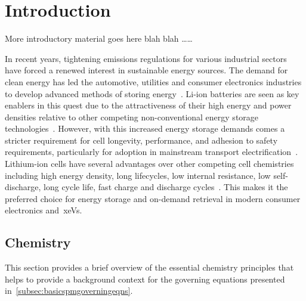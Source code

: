 
\clearpage
\chapter{Introduction}\label{ch:intro}

More introductory material goes here blah blah \dots \dots

In  recent  years,  tightening  emissions  regulations  for  various  industrial
sectors  have  forced   a  renewed  interest  in   sustainable  energy  sources.
The   demand  for   clean  energy   has  led   the  automotive,   utilities  and
consumer  electronics   industries  to  develop  advanced   methods  of  storing
energy~\cite{Weiss2011}.  Li-ion   batteries  are   seen  as  key   enablers  in
this  quest  due   to  the  attractiveness  of  their  high   energy  and  power
densities   relative  to   other  competing   non-conventional  energy   storage
technologies~\cite{Ibrahim2008}.  However, with  this  increased energy  storage
demands  comes  a stricter  requirement  for  cell longevity,  performance,  and
adhesion  to  safety  requirements,  particularly  for  adoption  in  mainstream
transport  electrification~\cite{Andrea2010}.  Lithium-ion  cells  have  several
advantages over other competing cell  chemistries including high energy density,
long lifecycles, low  internal resistance, low self-discharge,  long cycle life,
fast charge  and discharge cycles~\cite{Reddy2011,Plett2015}. This  makes it the
preferred choice for  energy storage and on-demand retrieval  in modern consumer
electronics and~\glspl{xeV}.


\section{Chemistry}\label{subsec:liionchemistry}

This section  provides a  brief overview of  the essential  chemistry principles
that helps to provide a background context for the governing equations presented
in~\cref{subsec:basicspmgoverningeqns}.



